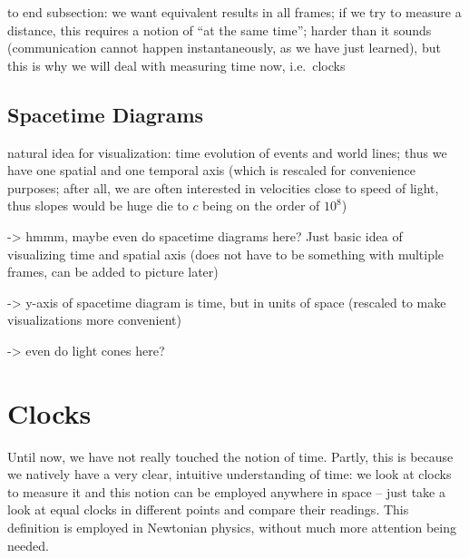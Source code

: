 to end subsection: we want equivalent results in all frames; if we try to measure a distance, this requires a notion of \enquote{at the same time}; harder than it sounds (communication cannot happen instantaneously, as we have just learned), but this is why we will deal with measuring time now, i.e.~clocks



		\subsection{Spacetime Diagrams}
natural idea for visualization: time evolution of events and world lines; thus we have one spatial and one temporal axis (which is rescaled for convenience purposes; after all, we are often interested in velocities close to speed of light, thus slopes would be huge die to $c$ being on the order of $10^8$)

-> hmmm, maybe even do spacetime diagrams here? Just basic idea of visualizing time and spatial axis (does not have to be something with multiple frames, can be added to picture later)

-> y-axis of spacetime diagram is time, but in units of space (rescaled to make visualizations more convenient)


-> even do light cones here?


\begin{figure}
\centering


\caption{}
\end{figure}



\newpage



	\section{Clocks}%
Until now, we have not really touched the notion of time. Partly, this is because we natively have a very clear, intuitive understanding of time: we look at clocks to measure it and this notion can be employed anywhere in space -- just take a look at equal clocks in different points and compare their readings. This definition is employed in Newtonian physics, without much more attention being needed.


